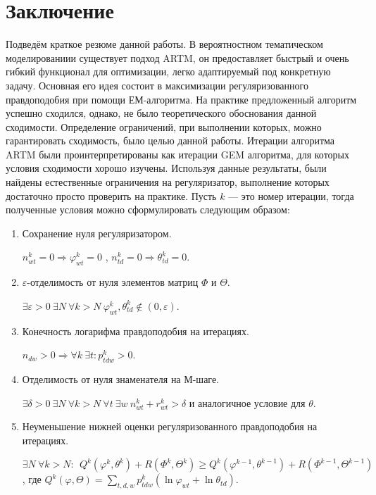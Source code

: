 \documentclass[12pt]{article}
\renewcommand{\geq}{\geqslant}
\renewcommand{\phi}{\varphi}
\begin{document}
\section{Заключение}
	Подведём краткое резюме данной работы. В вероятностном тематическом моделированиии существует подход ARTM, он предоставляет быстрый и очень гибкий функционал для оптимизации, легко адаптируемый под конкретную задачу. Основная его идея состоит в максимизации регуляризованного правдоподобия при помощи ЕМ-алгоритма. На практике предложенный алгоритм успешно сходился, однако, не было теоретического обоснования данной сходимости. Определение ограничений, при выполнении которых, можно гарантировать сходимость, было целью данной работы. Итерации алгоритма ARTM были проинтерпретированы как итерации GEM алгоритма, для которых условия сходимости хорошо изучены. Используя данные результаты, были найдены естественные ограничения на регуляризатор, выполнение которых достаточно просто проверить на практике. Пусть $k$ --- это номер итерации, тогда полученные условия можно сформулировать следующим образом:
\begin{enumerate}
\item Сохранение нуля регуляризатором.
\smallskip

$ n^k_{wt} = 0 \Rightarrow \phi^k_{wt} = 0$ , $n^k_{td} = 0 \Rightarrow \theta^k_{td} = 0$.
\item $\varepsilon$-отделимость от нуля элементов матриц $\Phi$ и $\Theta$.
\smallskip

$\exists \varepsilon>0\ \exists N\ \forall k > N\ \phi^k_{wt}, \theta^k_{td} \notin (0, \varepsilon)$. 
\item  Конечность логарифма правдоподобия на итерациях.
\smallskip

$ n_{dw}>0 \Rightarrow \forall k\ \exists t\colon p^k_{tdw} > 0$.
\item Отделимость от нуля знаменателя на М-шаге.
\smallskip

$\exists \delta >0\ \exists N\ \forall k > N \ \forall t\ \exists w\  n^k_{wt} + r^k_{wt} > \delta$ и аналогичное условие для $\theta$. 
\item Неуменьшение нижней оценки регуляризованного правдоподобия на итерациях.
\smallskip

$\exists N\ \forall k > N\colon\ \ Q^k (\phi^k, \theta^k)+ R(\Phi^k, \Theta^k) \geq Q^k(\phi^{k-1}, \theta^{k-1}) + R(\Phi^{k-1}, \Theta^{k-1})$, где $Q^k(\phi, \Theta) = \sum\limits_{t,d,w} p^k_{tdw} (\ln \phi_{wt} + \ln \theta_{td})$.
\end{enumerate}
\end{document}

